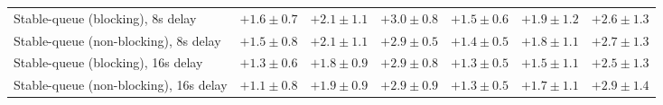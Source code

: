 \begin{table}[H]
{\begin{tabular}{l w{c}{5.0em} w{c}{5.0em} w{c}{5.0em} w{c}{5.0em} w{c}{5.0em} w{c}{5.0em}}
Stable-queue (blocking), 8s delay & $+1.6\pm0.7$ & $+2.1\pm1.1$ & $+3.0\pm0.8$ & $+1.5\pm0.6$ & $+1.9\pm1.2$ & $+2.6\pm1.3$ \\
Stable-queue (non-blocking), 8s delay & $+1.5\pm0.8$ & $+2.1\pm1.1$ & $+2.9\pm0.5$ & $+1.4\pm0.5$ & $+1.8\pm1.1$ & $+2.7\pm1.3$ \\
Stable-queue (blocking), 16s delay & $+1.3\pm0.6$ & $+1.8\pm0.9$ & $+2.9\pm0.8$ & $+1.3\pm0.5$ & $+1.5\pm1.1$ & $+2.5\pm1.3$ \\
Stable-queue (non-blocking), 16s delay & $+1.1\pm0.8$ & $+1.9\pm0.9$ & $+2.9\pm0.9$ & $+1.3\pm0.5$ & $+1.7\pm1.1$ & $+2.9\pm1.4$ \\
\bottomrule
\end{tabular}%
}
\end{table}
